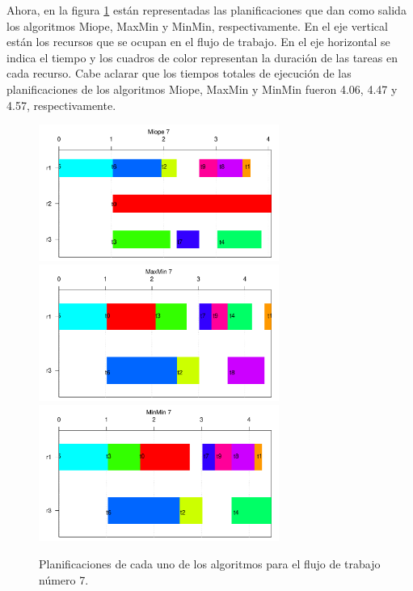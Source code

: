 Ahora, en la figura \ref{fig:schedules6} están representadas las planificaciones que dan como salida los algoritmos Miope, MaxMin y MinMin, respectivamente. En el eje vertical están los recursos que se ocupan en el flujo de trabajo. En el eje horizontal se indica el tiempo y los cuadros de color representan la duración de las tareas en cada recurso. Cabe aclarar que los tiempos totales de ejecución de las planificaciones de los algoritmos Miope, MaxMin y MinMin fueron 4.06, 4.47 y 4.57, respectivamente.

\begin{figure}
\begin{center}
  \includegraphics[width=0.7\textwidth]{imagenes/Myopic6.pdf}
  \includegraphics[width=0.7\textwidth]{imagenes/MaxMin6.pdf}
  \includegraphics[width=0.7\textwidth]{imagenes/MinMin6.pdf}
\end{center}
\caption{Planificaciones de cada uno de los algoritmos para el flujo de trabajo número 7.}
\label{fig:schedules6}
\end{figure}

